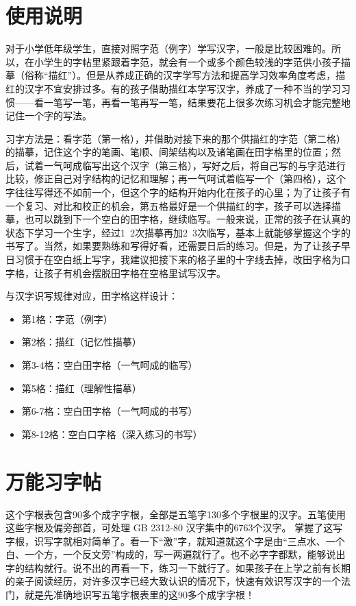 \documentclass[UTF8, adobefonts, oneside]{ctexbook} \newcommand{\whzkjk}{\kaishu}
\title{\doctitle}
\begin{document}
\setlength{\parindent}{0pt}


\chapter*{使用说明}
\normalsize




对于小学低年级学生，直接对照字范（例字）学写汉字，一般是比较困难的。所以，在小学生的字帖里紧跟着字范，就会有一个或多个颜色较浅的字范供小孩子描摹（俗称“描红”）。但是从养成正确的汉字学写方法和提高学习效率角度考虑，描红的汉字不宜安排过多。有的孩子借助描红本学写汉字，养成了一种不当的学习习惯——看一笔写一笔，再看一笔再写一笔，结果要花上很多次练习机会才能完整地记住一个字的写法。


习字方法是：看字范（第一格），并借助对接下来的那个供描红的字范（第二格）的描摹，记住这个字的笔画、笔顺、间架结构以及诸笔画在田字格里的位置；然后，试着一气呵成临写出这个汉字（第三格），写好之后，将自己写的与字范进行比较，修正自己对字结构的记忆和理解；再一气呵试着临写一个（第四格），这个字往往写得还不如前一个，但这个字的结构开始内化在孩子的心里；为了让孩子有一个复习、对比和校正的机会，第五格最好是一个供描红的字，孩子可以选择描摹，也可以跳到下一个空白的田字格，继续临写。一般来说，正常的孩子在认真的状态下学习一个生字，经过1~2次描摹再加2~3次临写，基本上就能够掌握这个字的书写了。当然，如果要熟练和写得好看，还需要日后的练习。但是，为了让孩子早日习惯于在空白纸上写字，我建议把接下来的格子里的十字线去掉，改田字格为口字格，让孩子有机会摆脱田字格在空格里试写汉字。

与汉字识写规律对应，田字格这样设计：

\begin{itemize}
  \item 第1格：字范（例字）
  \item 第2格：描红（记忆性描摹）
  \item 第3-4格：空白田字格（一气呵成的临写）
  \item 第5格：描红（理解性描摹）
  \item 第6-7格：空白田字格（一气呵成的书写）
  \item 第8-12格：空白口字格（深入练习的书写）
\end{itemize}


\chapter{万能习字帖}
\normalsize

这个字根表包含90多个成字字根，全部是五笔字130多个字根里的汉字。五笔使用这些字根及偏旁部首，可处理 GB 2312-80 汉字集中的6763个汉字。
掌握了这写字根，识写字就相对简单了。看一下“激”字，就知道就这个字是由“三点水、一个白、一个方，一个反文旁”构成的，写一两遍就行了。也不必字字都默，能够说出字的结构就行。说不出的再看一下，练习一下就行了。如果孩子在上学之前有长期的亲子阅读经历，对许多汉字已经大致认识的情况下，快速有效识写汉字的一个法门，就是先准确地识写五笔字根表里的这90多个成字字根！
\end{document}
